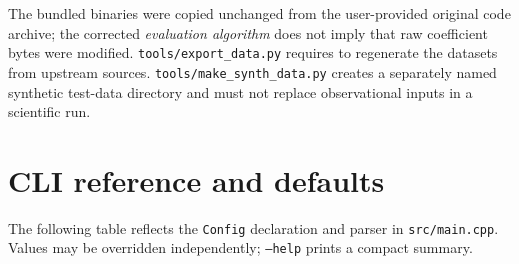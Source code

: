 \documentclass[11pt,a4paper]{article}
\newcommand{\opt}[1]{\texttt{#1}}
\newcommand{\pathcode}[1]{\nolinkurl{#1}}
\newcommand{\kbd}[1]{\texttt{\detokenize{#1}}}
\begin{document}
The bundled binaries were copied unchanged from the user-provided original code archive; the corrected \emph{evaluation algorithm} does not imply that raw coefficient bytes were modified. \pathcode{tools/export_data.py} requires \kbd{pyshtools} to regenerate the datasets from upstream sources. \pathcode{tools/make_synth_data.py} creates a separately named synthetic test-data directory and must not replace observational inputs in a scientific run.

\section{CLI reference and defaults}
\label{sec:options}
The following table reflects the \pathcode{Config} declaration and parser in \pathcode{src/main.cpp}. Values may be overridden independently; \opt{--help} prints a compact summary.
\end{document}
